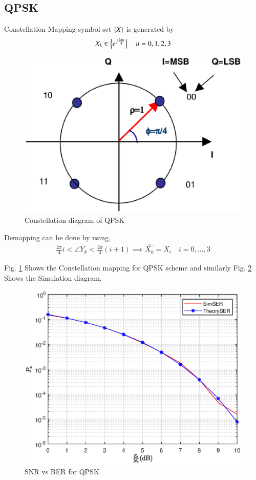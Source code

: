 \documentclass[journal,12pt,twocolumn]{IEEEtran}
\begin{document}
\subsection{QPSK}
Constellation Mapping symbol set $\left\{X\right\}$ is generated by
\begin{equation}
X_k \in \left\{e^{j \frac{2\pi n}{4}}\right\} \quad n=0,1,2,3
\end{equation}
%
\begin{figure}[!ht]
\begin{center}
\includegraphics[width=\columnwidth]{./figs/qpsk}
\end{center}
\caption{Constellation diagram of QPSK}
\label{fig:qpsk}
\end{figure}
Demapping can be done by using,
\begin{align}
\frac{2\pi }{4}i < \angle{Y_k} < \frac{2\pi }{4}(i+1) \implies \hat{X_k}=X_i \quad i=0,\dots,3
\end{align}

Fig. \ref{fig:qpsk} Shows the Constellation mapping for QPSK scheme and similarly Fig. \ref{fig:qpsk1} Shows the Simulation diagram.
\begin{figure}[!ht]
\begin{center}
\includegraphics[width=\columnwidth]{./figs/QPSK1}
\end{center}
\caption{SNR vs BER for QPSK}
\label{fig:qpsk1}
\end{figure}
\end{document}
